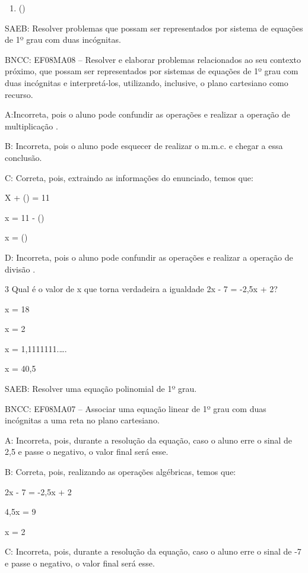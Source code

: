 {\begin{enumerate}
\def\labelenumi{\alph{enumi})}
\setcounter{enumi}{3}
\tightlist
\item
  ()
\end{enumerate}

SAEB: Resolver problemas que possam ser representados por sistema de
equações de 1º grau com duas incógnitas.

BNCC: EF08MA08 -- Resolver e elaborar problemas relacionados ao seu
contexto próximo, que possam ser representados por sistemas de equações
de 1º grau com duas incógnitas e interpretá-los, utilizando, inclusive,
o plano cartesiano como recurso.

A:Incorreta, pois o aluno pode confundir as operações e realizar a
operação de multiplicação .

B: Incorreta, pois o aluno pode esquecer de realizar o m.m.c. e chegar a
essa conclusão.

C: Correta, pois, extraindo as informações do enunciado, temos que:

X + () = 11

x = 11 - ()

x = ()

D: Incorreta, pois o aluno pode confundir as operações e realizar a
operação de divisão .

\num{3} Qual é o valor de x que torna verdadeira a igualdade 2x - 7 = -2,5x +
2?
\item x = 18
\item x = 2
\item x = 1,1111111.\ldots.
\item x = 40,5

SAEB: Resolver uma equação polinomial de 1º grau.

BNCC: EF08MA07 -- Associar uma equação linear de 1º grau com duas
incógnitas a uma reta no plano cartesiano.

A: Incorreta, pois, durante a resolução da equação, caso o aluno erre o
sinal de 2,5 e passe o negativo, o valor final será esse.

B: Correta, pois, realizando as operações algébricas, temos que:

2x - 7 = -2,5x + 2

4,5x = 9

x = 2

C: Incorreta, pois, durante a resolução da equação, caso o aluno erre o
sinal de -7 e passe o negativo, o valor final será esse.

}
